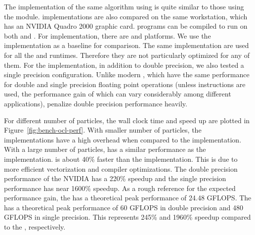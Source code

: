 The implementation of the same algorithm using \opencl is quite similar to
those using the \smp module. \opencl implementations are also compared on the
same workstation, which has an NVIDIA Quadro 2000 graphic card. \opencl
programs can be compiled to run on both \cpu and \gpu. For \cpu
implementation, there are \iocl \cite{iocl} and \aocl \cite{aocl} platforms.
We use the \tbb implementation as a baseline for comparison. The same \opencl
implementation are used for all the \cpu and \gpu runtimes. Therefore they are
not particularly optimized for any of them. For the \gpu implementation, in
addition to double precision, we also tested a single precision configuration.
Unlike modern \cpu, which have the same performance for double and single
precision floating point operations (unless \simd instructions are used, the
performance gain of which can vary considerably among different applications),
\gpu penalize double precision performance heavily.

For different number of particles, the wall clock time and speed up are
plotted in Figure~\ref{fig:bench-ocl-perf}. With smaller number of particles,
the \opencl implementations have a high overhead when compared to the \tbb
implementation. With a large number of particles, \aocl has a similar
performance as the \tbb implementation. \iocl is about 40\% faster than the
\tbb implementation. This is due to more efficient vectorization and compiler
optimizations. The double precision performance of the NVIDIA \gpu has a 220\%
speedup and the single precision performance has near 1600\% speedup. As a
rough reference for the expected performance gain, the \cpu has a theoretical
peak performance of 24.48 GFLOPS. The \gpu has a theoretical peak performance
of 60 GFLOPS in double precision and 480 GFLOPS in single precision. This
represents 245\% and 1960\% speedup compared to the \cpu, respectively.

